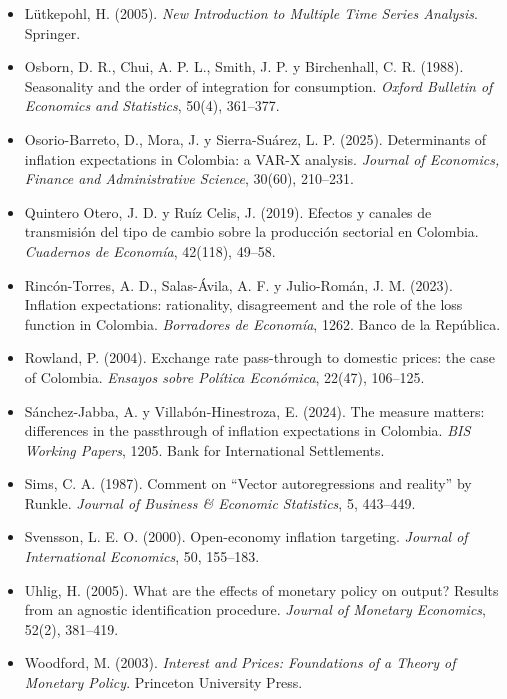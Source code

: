 \documentclass[12pt,letterpaper]{article}
\begin{document}
\begin{itemize}[label={}, leftmargin=1.5em, itemindent=-1.5em]
\item L\"utkepohl, H. (2005). \textit{New Introduction to Multiple Time Series Analysis}. Springer.
\item Osborn, D. R., Chui, A. P. L., Smith, J. P. y Birchenhall, C. R. (1988). Seasonality and the order of integration for consumption. \textit{Oxford Bulletin of Economics and Statistics}, 50(4), 361--377.
\item Osorio-Barreto, D., Mora, J. y Sierra-Su\'arez, L. P. (2025). Determinants of inflation expectations in Colombia: a VAR-X analysis. \textit{Journal of Economics, Finance and Administrative Science}, 30(60), 210--231.
\item Quintero Otero, J. D. y Ru\'iz Celis, J. (2019). Efectos y canales de transmisi\'on del tipo de cambio sobre la producci\'on sectorial en Colombia. \textit{Cuadernos de Econom\'ia}, 42(118), 49--58.
\item Rinc\'on-Torres, A. D., Salas-\'Avila, A. F. y Julio-Rom\'an, J. M. (2023). Inflation expectations: rationality, disagreement and the role of the loss function in Colombia. \textit{Borradores de Econom\'ia}, 1262. Banco de la Rep\'ublica.
\item Rowland, P. (2004). Exchange rate pass-through to domestic prices: the case of Colombia. \textit{Ensayos sobre Pol\'itica Econ\'omica}, 22(47), 106--125.
\item S\'anchez-Jabba, A. y Villab\'on-Hinestroza, E. (2024). The measure matters: differences in the passthrough of inflation expectations in Colombia. \textit{BIS Working Papers}, 1205. Bank for International Settlements.
\item Sims, C. A. (1987). Comment on ``Vector autoregressions and reality'' by Runkle. \textit{Journal of Business \& Economic Statistics}, 5, 443--449.
\item Svensson, L. E. O. (2000). Open-economy inflation targeting. \textit{Journal of International Economics}, 50, 155--183.
\item Uhlig, H. (2005). What are the effects of monetary policy on output? Results from an agnostic identification procedure. \textit{Journal of Monetary Economics}, 52(2), 381--419.
\item Woodford, M. (2003). \textit{Interest and Prices: Foundations of a Theory of Monetary Policy}. Princeton University Press.
\end{itemize}

\clearpage
\end{document}
